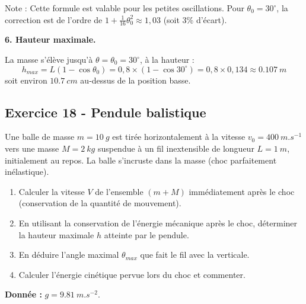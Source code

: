 \documentclass[12pt,a4paper]{article}
\begin{document}
\begin{boitecorrige}
Note : Cette formule est valable pour les petites oscillations. Pour $\theta_0 = 30^\circ $, la correction est de l'ordre de $1 + \frac{1}{16}\theta_0^2 \approx 1{,}03$ (soit 3\% d'écart).

\textbf{6. Hauteur maximale.}

La masse s'élève jusqu'à $\theta = \theta_0 = 30^\circ $, à la hauteur :
\[
h_{max} = L(1 - \cos\theta_0) = 0{,}8\times(1 - \cos 30^\circ ) = 0{,}8\times0{,}134 \approx \qty{0.107}{m}
\]
soit environ $\qty{10.7}{cm}$ au-dessus de la position basse.
\end{boitecorrige}

\subsection*{Exercice 18 - Pendule balistique \niveau{\difficile}}

\begin{boiteexercice}
Une balle de masse $m = \qty{10}{g}$ est tirée horizontalement à la vitesse $v_0 = \qty{400}{m.s^{-1}}$ vers une masse $M = \qty{2}{kg}$ suspendue à un fil inextensible de longueur $L = \qty{1}{m}$, initialement au repos. La balle s'incruste dans la masse (choc parfaitement inélastique).
\begin{enumerate}
  \item Calculer la vitesse $V$ de l'ensemble $(m+M)$ immédiatement après le choc (conservation de la quantité de mouvement).
  \item En utilisant la conservation de l'énergie mécanique après le choc, déterminer la hauteur maximale $h$ atteinte par le pendule.
  \item En déduire l'angle maximal $\theta_{max}$ que fait le fil avec la verticale.
  \item Calculer l'énergie cinétique pervue lors du choc et commenter.
\end{enumerate}
\textbf{Donnée :} $g = \qty{9.81}{m.s^{-2}}$.
\end{boiteexercice}
\end{document}

